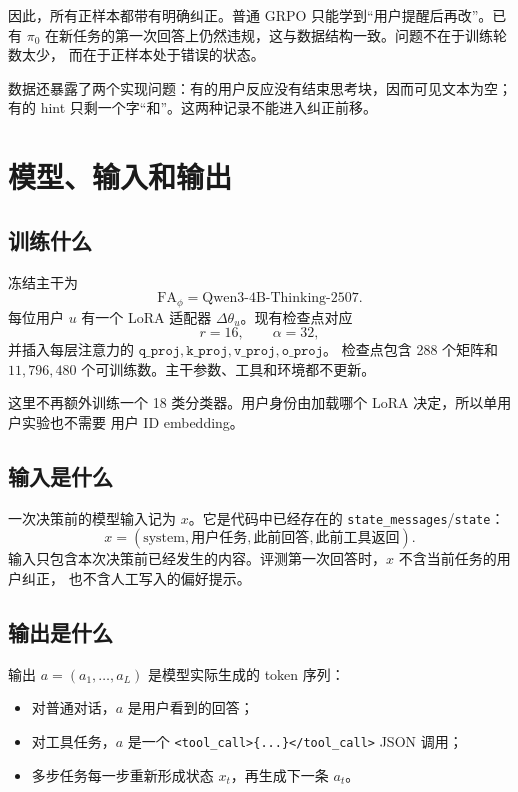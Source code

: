 \documentclass[11pt,UTF8,fontset=fandol]{ctexart}
\newcommand{\FA}{\mathrm{FA}_{\phi}}
\newcommand{\lora}{\Delta\theta_u}
\begin{document}
因此，所有正样本都带有明确纠正。普通 GRPO 只能学到``用户提醒后再改''。已有
\(\pi_0\) 在新任务的第一次回答上仍然违规，这与数据结构一致。问题不在于训练轮数太少，
而在于正样本处于错误的状态。

数据还暴露了两个实现问题：有的用户反应没有结束思考块，因而可见文本为空；有的 hint
只剩一个字``和''。这两种记录不能进入纠正前移。

\section{模型、输入和输出}

\subsection{训练什么}

冻结主干为
\[
  \FA=\text{Qwen3-4B-Thinking-2507}.
\]
每位用户 \(u\) 有一个 LoRA 适配器 \(\lora\)。现有检查点对应
\[
  r=16,\qquad \alpha=32,
\]
并插入每层注意力的
\(\texttt{q\_proj},\texttt{k\_proj},\texttt{v\_proj},\texttt{o\_proj}\)。
检查点包含 288 个矩阵和 \(11{,}796{,}480\) 个可训练数。主干参数、工具和环境都不更新。

这里不再额外训练一个 18 类分类器。用户身份由加载哪个 LoRA 决定，所以单用户实验也不需要
用户 ID embedding。

\subsection{输入是什么}

一次决策前的模型输入记为 \(x\)。它是代码中已经存在的
\texttt{state\_messages}/\texttt{state}：
\[
  x=(\text{system},\text{用户任务},\text{此前回答},
  \text{此前工具返回}).
\]
输入只包含本次决策前已经发生的内容。评测第一次回答时，\(x\) 不含当前任务的用户纠正，
也不含人工写入的偏好提示。

\subsection{输出是什么}

输出 \(a=(a_1,\ldots,a_L)\) 是模型实际生成的 token 序列：
\begin{itemize}
  \item 对普通对话，\(a\) 是用户看到的回答；
  \item 对工具任务，\(a\) 是一个
  \texttt{<tool\_call>\{...\}</tool\_call>} JSON 调用；
  \item 多步任务每一步重新形成状态 \(x_t\)，再生成下一条 \(a_t\)。
\end{itemize}
\end{document}
